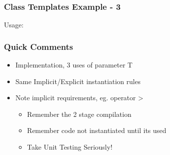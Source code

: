\begin{Shaded}
\begin{Highlighting}[]
 \NormalTok{<} 
  
\NormalTok{\{}
  \NormalTok{m_Values[}\NormalTok{] = first;}
  \NormalTok{m_Values[}\NormalTok{] = second;}
\NormalTok{\}}

 \NormalTok{<} 
\NormalTok{\{}
   \NormalTok{(m_Values[}\NormalTok{] > m_Values[}\NormalTok{])}
     \NormalTok{m_Values[}\NormalTok{];}
     \NormalTok{m_Values[}\NormalTok{];}
\NormalTok{\}}
\end{Highlighting}
\end{Shaded}

\subsubsection{Class Templates Example -
3}\label{class-templates-example---3}

Usage:

\begin{Shaded}
\begin{Highlighting}[]

  
\NormalTok{\{}
  \NormalTok{,}\NormalTok{);}
   
\NormalTok{\}}
\end{Highlighting}
\end{Shaded}

\subsubsection{Quick Comments}\label{quick-comments}

\begin{itemize}
\itemsep1pt\parskip0pt
\item
  Implementation, 3 uses of parameter T
\item
  Same Implicit/Explicit instantiation rules
\item
  Note implicit requirements, eg. operator \textgreater{}

  \begin{itemize}
  \itemsep1pt\parskip0pt
  \item
    Remember the 2 stage compilation
  \item
    Remember code not instantiated until its used
  \item
    Take Unit Testing Seriously!
  \end{itemize}
\end{itemize}


